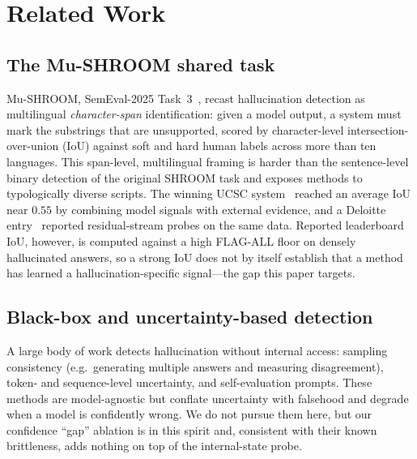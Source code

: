\documentclass[conference]{IEEEtran}
\begin{document}
\section{Related Work}

\subsection{The Mu-SHROOM shared task}
Mu-SHROOM, SemEval-2025 Task~3~\cite{mushroom}, recast hallucination detection
as multilingual \emph{character-span} identification: given a model output, a
system must mark the substrings that are unsupported, scored by character-level
intersection-over-union (IoU) against soft and hard human labels across more
than ten languages. This span-level, multilingual framing is harder than the
sentence-level binary detection of the original SHROOM task and exposes
methods to typologically diverse scripts. The winning UCSC
system~\cite{ucsc} reached an average IoU near $0.55$ by combining model
signals with external evidence, and a Deloitte entry~\cite{deloitte} reported
residual-stream probes on the same data. Reported leaderboard IoU, however,
is computed against a high FLAG-ALL floor on densely hallucinated answers, so a
strong IoU does not by itself establish that a method has learned a
hallucination-specific signal---the gap this paper targets.

\subsection{Black-box and uncertainty-based detection}
A large body of work detects hallucination without internal access: sampling
consistency (e.g.\ generating multiple answers and measuring disagreement),
token- and sequence-level uncertainty, and self-evaluation prompts. These
methods are model-agnostic but conflate uncertainty with falsehood and degrade
when a model is confidently wrong. We do not pursue them here, but our
confidence ``gap'' ablation is in this spirit and, consistent with their known
brittleness, adds nothing on top of the internal-state probe.
\end{document}
